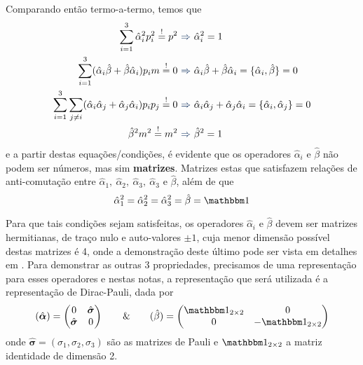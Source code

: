 Comparando então termo-a-termo, temos que
    \begin{align*}
        \sum_{i=1}^{3}\hat{\alpha}_{i}^{2}p_{i}^{2} \overset{!}{=} p^{2} &{\color{myLColor}\ \Rightarrow\ } \hat{\alpha}_{i}^{2} = 1 \\
        \sum_{i=1}^{3}(\hat{\alpha}_{i}\hat{\beta} + \hat{\beta}\hat{\alpha}_{i})p_{i}m \overset{!}{=} 0 &{\color{myLColor}\ \Rightarrow\ } \hat{\alpha}_{i}\hat{\beta} + \hat{\beta}\hat{\alpha}_{i} = \{\hat{\alpha}_{i},\hat{\beta}\} = 0 \\
        \sum_{i=1}^{3}\sum_{j\neq i}(\hat{\alpha}_{i}\hat{\alpha}_{j} + \hat{\alpha}_{j}\hat{\alpha}_{i})p_{i}p_{j} \overset{!}{=} 0 &{\color{myLColor}\ \Rightarrow\ } \hat{\alpha}_{i}\hat{\alpha}_{j} + \hat{\alpha}_{j}\hat{\alpha}_{i} = \{\hat{\alpha}_{i},\hat{\alpha}_{j}\} = 0 \\
        \hat{\beta}^{2}m^{2} \overset{!}{=} m^{2} &{\color{myLColor}\ \Rightarrow\ } \hat{\beta}^{2} = 1
    \end{align*}
e a partir destas equações/condições, é evidente que os operadores $\hat{\alpha}_{i}$ e $\hat{\beta}$ não podem ser números, mas sim \textbf{matrizes}. Matrizes estas que satisfazem relações de anti-comutação entre $\hat{\alpha}_{1},\ \hat{\alpha}_{2},\ \hat{\alpha}_{3},\ \hat{\alpha}_{3}$ e $\hat{\beta}$, além de que
    \begin{equation*}
        \hat{\alpha}_{1}^{2} = \hat{\alpha}_{2}^{2} = \hat{\alpha}_{3}^{2} = \hat{\beta} = \boldone
    \end{equation*}

    Para que tais condições sejam satisfeitas, os operadores $\hat{\alpha}_{i}$ e $\hat{\beta}$ devem ser matrizes hermitianas, de traço nulo e auto-valores $\pm 1$, cuja menor dimensão possível destas matrizes é 4, onde a demonstração deste último pode ser vista em detalhes em \textcite{Schiff}. Para demonstrar as outras 3 propriedades, precisamos de uma representação para esses operadores e nestas notas, a representação que será utilizada é a representação de Dirac-Pauli, dada por
        \begin{equation*}
            (\hat{\boldsymbol{\alpha}}) = \begin{pmatrix}
                0 & \hat{\boldsymbol{\sigma}} \\
                \hat{\boldsymbol{\sigma}} & 0
            \end{pmatrix} \qquad \& \qquad 
            (\hat{\beta}) = \begin{pmatrix}
                \boldone_{2\times 2} & 0 \\
                0 & -\boldone_{2\times 2}
            \end{pmatrix}
        \end{equation*}
    onde $\hat{\boldsymbol{\sigma}} = (\sigma_{1},\sigma_{2},\sigma_{3})$ são as matrizes de Pauli e $\boldone_{2\times2}$ a matriz identidade de dimensão 2.







